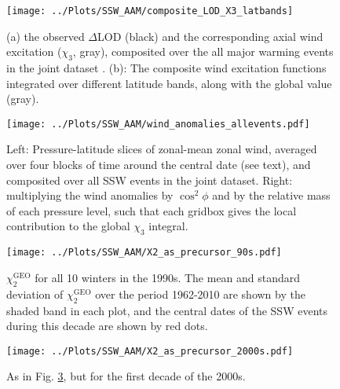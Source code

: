 \documentclass[draft,jgrga]{agutex}
\begin{document}
 
 
\begin{figure}
  \noindent
  \texttt{[image: ../Plots/SSW\_AAM/composite\_LOD\_X3\_latbands]} 
   \caption{ (a) the observed $\Delta$LOD (black) and the corresponding axial wind excitation ($\chi_3$, gray), composited over  {the all major warming events in the joint dataset} . (b): The composite wind excitation functions integrated over different latitude bands, along with the global value (gray). }
   \label{fig:composites_X3}
 \end{figure}

\begin{figure}
  \noindent
\texttt{[image: ../Plots/SSW\_AAM/wind\_anomalies\_allevents.pdf]}
   \caption{ Left: Pressure-latitude slices of zonal-mean zonal wind, averaged over four blocks of time around the central date (see text), and composited over all SSW events in the joint dataset.  Right: multiplying the wind anomalies by $\cos^2 \phi$ and by the relative mass of each pressure level, such that each gridbox gives the local contribution to the global $\chi_3$ integral.
}
   \label{fig:wind_anomaly_composites}
 \end{figure}



\begin{figure}
  \noindent
\texttt{[image: ../Plots/SSW\_AAM/X2\_as\_precursor\_90s.pdf]}
   \caption{$\chi_2^{\text{GEO}}$ for all 10 winters in the 1990s.  The mean and standard deviation of $\chi_2^{\text{GEO}}$ over the period 1962-2010 are shown by the shaded band in each plot, and the central dates of the  SSW events during this decade are shown by red dots.}
   \label{fig:X2_1990s}
 \end{figure}


\begin{figure}
  \noindent
\texttt{[image: ../Plots/SSW\_AAM/X2\_as\_precursor\_2000s.pdf]}
   \caption{As in Fig. \ref{fig:X2_1990s}, but for the first decade of the 2000s.  }
   \label{fig:X2_2000s}
 \end{figure}



%
%
\end{document}

